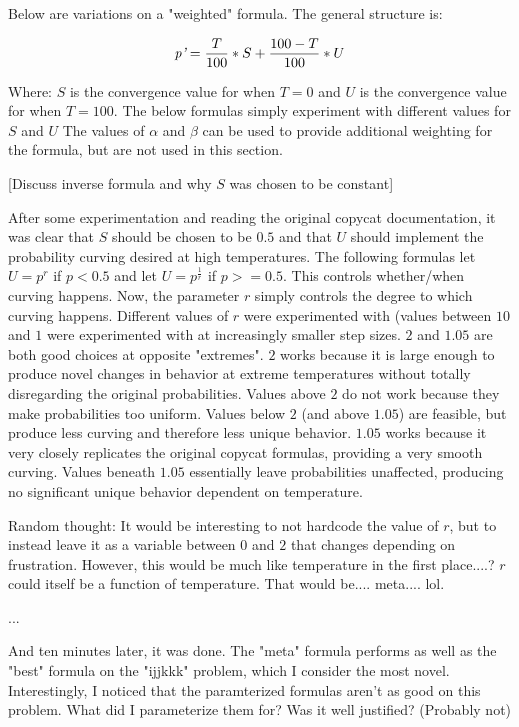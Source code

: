 \documentclass[a4paper]{article}
\begin{document}
Below are variations on a "weighted" formula.
The general structure is:

\[\emph{p'} = \frac{T}{100} * S + \frac{100-T}{100} * U\]

Where: $S$ is the convergence value for when $T = 0$ and
       $U$ is the convergence value for when $T = 100$.
The below formulas simply experiment with different values for $S$ and $U$
The values of $\alpha$ and $\beta$ can be used to provide additional weighting for the formula, but are not used in this section.



[Discuss inverse formula and why $S$ was chosen to be constant]

After some experimentation and reading the original copycat documentation, it was clear that $S$ should be chosen to be $0.5$ and that $U$ should implement the probability curving desired at high temperatures. 
The following formulas let $U = p^r$ if $p < 0.5$ and let $U = p^\frac{1}{r}$ if $p >= 0.5$.
This controls whether/when curving happens.
Now, the parameter $r$ simply controls the degree to which curving happens.
Different values of $r$ were experimented with (values between $10$ and $1$ were experimented with at increasingly smaller step sizes. 
$2$ and $1.05$ are both good choices at  opposite "extremes".
$2$ works because it is large enough to produce novel changes in behavior at extreme temperatures without totally disregarding the original probabilities.
Values above $2$ do not work because they make probabilities too uniform.
Values below $2$ (and above $1.05$) are feasible, but produce less curving and therefore less unique behavior.
$1.05$ works because it very closely replicates the original copycat formulas, providing a very smooth curving.
Values beneath $1.05$ essentially leave probabilities unaffected, producing no significant unique behavior dependent on temperature.



Random thought:
It would be interesting to not hardcode the value of $r$, but to instead leave it as a variable between $0$ and $2$ that changes depending on frustration.
However, this would be much like temperature in the first place....?
$r$ could itself be a function of temperature. That would be.... meta.... lol.

\break
...
\break

And ten minutes later, it was done.
The "meta" formula performs as well as the "best" formula on the "ijjkkk" problem, which I consider the most novel.
Interestingly, I noticed that the paramterized formulas aren't as good on this problem. What did I parameterize them for? Was it well justified?
(Probably not)
\end{document}
